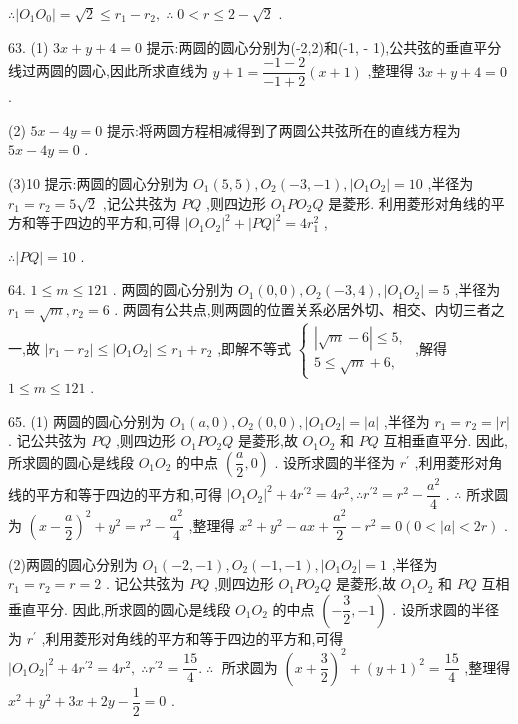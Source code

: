 $\therefore \left| {{O}_{1}{O}_{0}}\right|  = \sqrt{2} \leq  {r}_{1} - {r}_{2},\;\therefore \;0 < r \leq  2 - \sqrt{2}$ .

63. (1) ${3x} + y + 4 = 0$ 提示:两圆的圆心分别为(-2,2)和(-1, - 1),公共弦的垂直平分线过两圆的圆心,因此所求直线为 $y + 1 = \dfrac{-1 - 2}{-1 + 2}\left( {x + 1}\right)$ ,整理得 ${3x} + y + 4 = 0$ .

(2) ${5x} - {4y} = 0$ 提示:将两圆方程相减得到了两圆公共弦所在的直线方程为 ${5x} - {4y} = 0$ .

(3)10 提示:两圆的圆心分别为 ${O}_{1}\left( {5,5}\right) ,{O}_{2}\left( {-3, - 1}\right) ,\left| {{O}_{1}{O}_{2}}\right|  = {10}$ ,半径为 ${r}_{1} = {r}_{2} = 5\sqrt{2}$ ,记公共弦为 ${PQ}$ ,则四边形 ${O}_{1}P{O}_{2}Q$ 是菱形. 利用菱形对角线的平方和等于四边的平方和,可得 ${\left| {O}_{1}{O}_{2}\right| }^{2} + {\left| PQ\right| }^{2} = 4{r}_{1}^{2}$ ,

$\therefore \left| {PQ}\right|  = {10}$ .

64. $1 \leq  m \leq  {121}$ . 两圆的圆心分别为 ${O}_{1}\left( {0,0}\right) ,{O}_{2}\left( {-3,4}\right) ,\left| {{O}_{1}{O}_{2}}\right|  = 5$ ,半径为 ${r}_{1} = \sqrt{m},{r}_{2} = 6$ . 两圆有公共点,则两圆的位置关系必居外切、相交、内切三者之一,故 $\left| {{r}_{1} - {r}_{2}}\right|  \leq  \left| {{O}_{1}{O}_{2}}\right|  \leq  {r}_{1} + {r}_{2}$ ,即解不等式 $\left\{  \begin{array}{l} \left| {\sqrt{m} - 6}\right|  \leq  5, \\  5 \leq  \sqrt{m} + 6, \end{array}\right.$ ,解得 $1 \leq  m \leq  {121}$ .

65. (1) 两圆的圆心分别为 ${O}_{1}\left( {a,0}\right) ,{O}_{2}\left( {0,0}\right) ,\left| {{O}_{1}{O}_{2}}\right|  = \left| a\right|$ ,半径为 ${r}_{1} = {r}_{2} = \left| r\right|$ . 记公共弦为 ${PQ}$ ,则四边形 ${O}_{1}P{O}_{2}Q$ 是菱形,故 ${O}_{1}{O}_{2}$ 和 ${PQ}$ 互相垂直平分. 因此,所求圆的圆心是线段 ${O}_{1}{O}_{2}$ 的中点 $\left( {\dfrac{a}{2},0}\right)$ . 设所求圆的半径为 ${r}^{\prime }$ ,利用菱形对角线的平方和等于四边的平方和,可得 ${\left| {O}_{1}{O}_{2}\right| }^{2} + 4{r}^{\prime 2} = 4{r}^{2},\therefore {r}^{\prime 2} = {r}^{2} - \dfrac{{a}^{2}}{4}$ . $\therefore$ 所求圆为 ${\left( x - \dfrac{a}{2}\right) }^{2} + {y}^{2} = {r}^{2} - \dfrac{{a}^{2}}{4}$ ,整理得 ${x}^{2} + {y}^{2} - {ax} + \dfrac{{a}^{2}}{2} - {r}^{2} = 0\left( {0 < \left| a\right|  < {2r}}\right)$ .

(2)两圆的圆心分别为 ${O}_{1}\left( {-2, - 1}\right) ,{O}_{2}\left( {-1, - 1}\right) ,\left| {{O}_{1}{O}_{2}}\right|  = 1$ ,半径为 ${r}_{1} = {r}_{2} = r = 2$ . 记公共弦为 ${PQ}$ ,则四边形 ${O}_{1}P{O}_{2}Q$ 是菱形,故 ${O}_{1}{O}_{2}$ 和 ${PQ}$ 互相垂直平分. 因此,所求圆的圆心是线段 ${O}_{1}{O}_{2}$ 的中点 $\left( {-\dfrac{3}{2}, - 1}\right)$ . 设所求圆的半径为 ${r}^{\prime }$ ,利用菱形对角线的平方和等于四边的平方和,可得 ${\left| {O}_{1}{O}_{2}\right| }^{2} + 4{r}^{\prime 2} = 4{r}^{2},\;\therefore {r}^{\prime 2} = \dfrac{15}{4}.\;\therefore \;$ 所求圆为 ${\left( x + \dfrac{3}{2}\right) }^{2} + {\left( y + 1\right) }^{2} = \dfrac{15}{4}$ ,整理得 ${x}^{2} + {y}^{2} + {3x} + {2y} - \dfrac{1}{2} = 0$ .

